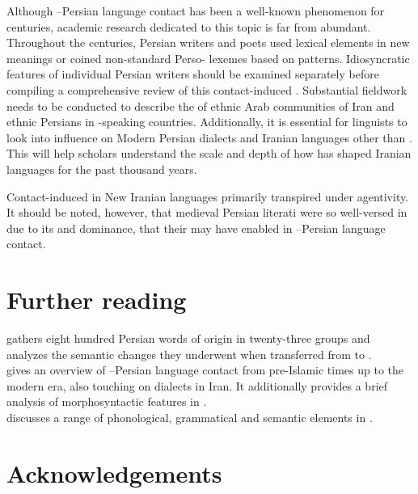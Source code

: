 \documentclass[output=paper]{langsci/langscibook}
\begin{document}
Although –Persian language contact has been a well-known phenomenon for centuries, academic research dedicated to this topic is far from abundant. Throughout the centuries, Persian writers and poets used  lexical elements in new meanings or coined non-standard Perso- lexemes based on   patterns. Idiosyncratic features of individual Persian writers should be examined separately before compiling a comprehensive review of this contact-induced . Substantial fieldwork needs to be conducted to describe the  of ethnic Arab communities of Iran and ethnic Persians in -speaking countries. Additionally, it is essential for linguists to look into  influence on Modern Persian dialects and Iranian languages other than . This will help scholars understand the scale and depth of how  has shaped Iranian languages for the past thousand years.

Contact-induced  in New Iranian languages primarily transpired under  agentivity. It should be noted, however, that medieval Persian literati were so well-versed in  due to its  and dominance, that their  may have enabled  in –Persian language contact.

\section*{Further reading}

\citet{Asbaghi1987} gathers eight hundred Persian words of  origin in twenty-three groups and analyzes the semantic changes they underwent when transferred from  to .\\
\citet{Gazsi2011} gives an overview of –Persian language contact from pre-Islamic times up to the modern era, also touching on  dialects in Iran. It additionally provides a brief analysis of  morphosyntactic features in .\\
\citet{Ṣādiqī2011} discusses a range of  phonological, grammatical and semantic elements in .

\section*{Acknowledgements}
\end{document}
